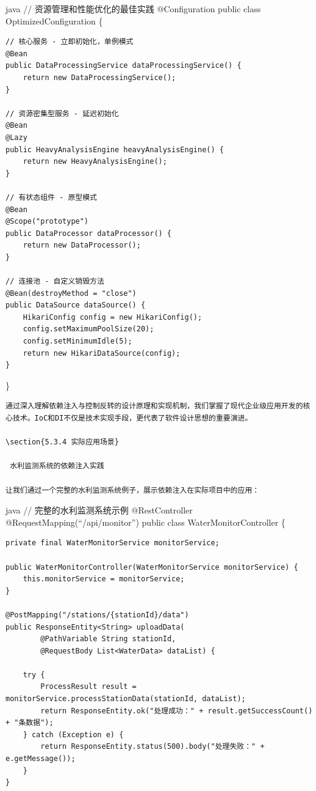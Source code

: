 java // 资源管理和性能优化的最佳实践 @Configuration public class OptimizedConfiguration \{

\begin{verbatim}
// 核心服务 - 立即初始化，单例模式
@Bean
public DataProcessingService dataProcessingService() {
    return new DataProcessingService();
}

// 资源密集型服务 - 延迟初始化
@Bean
@Lazy
public HeavyAnalysisEngine heavyAnalysisEngine() {
    return new HeavyAnalysisEngine();
}

// 有状态组件 - 原型模式
@Bean
@Scope("prototype")
public DataProcessor dataProcessor() {
    return new DataProcessor();
}

// 连接池 - 自定义销毁方法
@Bean(destroyMethod = "close")
public DataSource dataSource() {
    HikariConfig config = new HikariConfig();
    config.setMaximumPoolSize(20);
    config.setMinimumIdle(5);
    return new HikariDataSource(config);
}
\end{verbatim}

\}

\begin{lstlisting}
通过深入理解依赖注入与控制反转的设计原理和实现机制，我们掌握了现代企业级应用开发的核心技术。IoC和DI不仅是技术实现手段，更代表了软件设计思想的重要演进。

\section{5.3.4 实际应用场景}

 水利监测系统的依赖注入实践

让我们通过一个完整的水利监测系统例子，展示依赖注入在实际项目中的应用：
\end{lstlisting}

java // 完整的水利监测系统示例 @RestController @RequestMapping(``/api/monitor'') public class WaterMonitorController \{

\begin{verbatim}
private final WaterMonitorService monitorService;

public WaterMonitorController(WaterMonitorService monitorService) {
    this.monitorService = monitorService;
}

@PostMapping("/stations/{stationId}/data")
public ResponseEntity<String> uploadData(
        @PathVariable String stationId,
        @RequestBody List<WaterData> dataList) {
    
    try {
        ProcessResult result = monitorService.processStationData(stationId, dataList);
        return ResponseEntity.ok("处理成功：" + result.getSuccessCount() + "条数据");
    } catch (Exception e) {
        return ResponseEntity.status(500).body("处理失败：" + e.getMessage());
    }
}
\end{verbatim}

